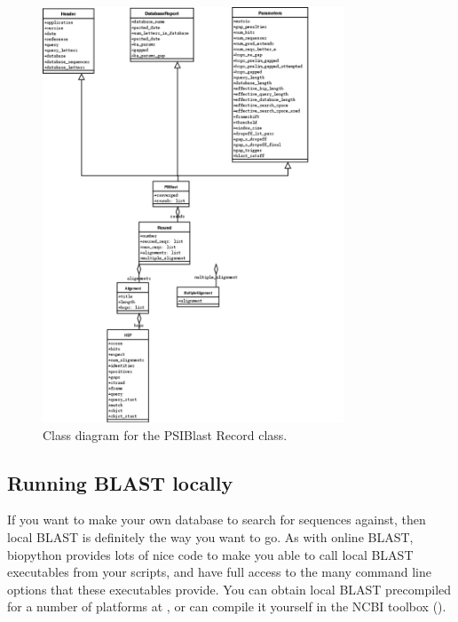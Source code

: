 \documentclass{report}
\begin{document}
\begin{latexonly}
\begin{figure}[htbp]
\centering
\includegraphics[width=0.8\textwidth]{images/PSIBlastRecord.png}
\caption{Class diagram for the PSIBlast Record class.}
\label{fig:psiblastrecord}
\end{figure}
\end{latexonly}

\subsection{Running BLAST locally}

If you want to make your own database to search for sequences against, then local BLAST is definitely the way you want to go. As with online BLAST, biopython provides lots of nice code to make you able to call local BLAST executables from your scripts, and have full access to the many command line options that these executables provide. You can obtain local BLAST precompiled for a number of platforms at , or can compile it yourself in the NCBI toolbox ().
\end{document}
